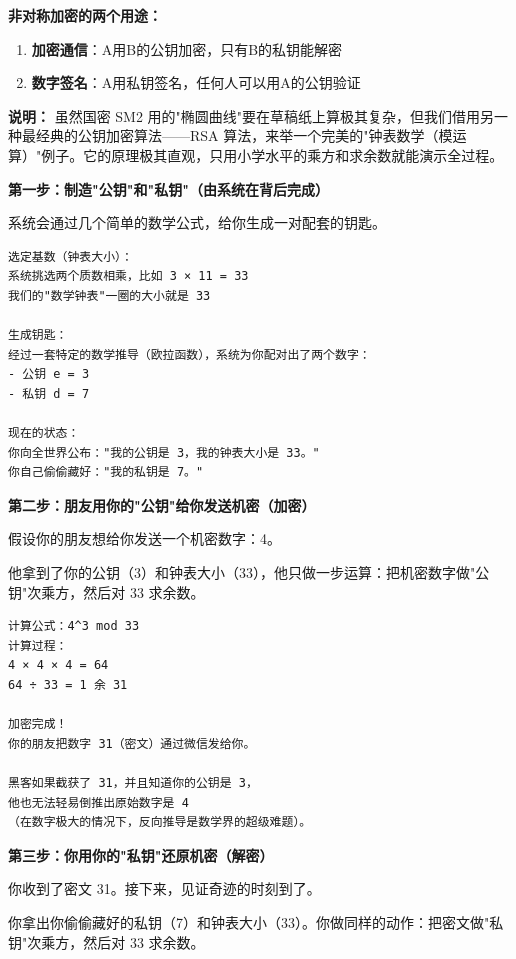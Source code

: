 ﻿\documentclass[12pt,a4paper]{article}
\begin{document}
\begin{theorybox}
\textbf{非对称加密的两个用途：}
\begin{enumerate}
\item \textbf{加密通信}：A用B的公钥加密，只有B的私钥能解密
\item \textbf{数字签名}：A用私钥签名，任何人可以用A的公钥验证
\end{enumerate}
\end{theorybox}

\begin{examplebox}
\textbf{说明：} 虽然国密 SM2 用的"椭圆曲线"要在草稿纸上算极其复杂，但我们借用另一种最经典的公钥加密算法——RSA 算法，来举一个完美的"钟表数学（模运算）"例子。它的原理极其直观，只用小学水平的乘方和求余数就能演示全过程。

\textbf{第一步：制造"公钥"和"私钥"（由系统在背后完成）}

系统会通过几个简单的数学公式，给你生成一对配套的钥匙。

\begin{lstlisting}
选定基数（钟表大小）：
系统挑选两个质数相乘，比如 3 × 11 = 33
我们的"数学钟表"一圈的大小就是 33

生成钥匙：
经过一套特定的数学推导（欧拉函数），系统为你配对出了两个数字：
- 公钥 e = 3
- 私钥 d = 7

现在的状态：
你向全世界公布："我的公钥是 3，我的钟表大小是 33。"
你自己偷偷藏好："我的私钥是 7。"
\end{lstlisting}

\textbf{第二步：朋友用你的"公钥"给你发送机密（加密）}

假设你的朋友想给你发送一个机密数字：4。

他拿到了你的公钥（3）和钟表大小（33），他只做一步运算：把机密数字做"公钥"次乘方，然后对 33 求余数。

\begin{lstlisting}
计算公式：4^3 mod 33
计算过程：
4 × 4 × 4 = 64
64 ÷ 33 = 1 余 31

加密完成！
你的朋友把数字 31（密文）通过微信发给你。

黑客如果截获了 31，并且知道你的公钥是 3，
他也无法轻易倒推出原始数字是 4
（在数字极大的情况下，反向推导是数学界的超级难题）。
\end{lstlisting}

\textbf{第三步：你用你的"私钥"还原机密（解密）}

你收到了密文 31。接下来，见证奇迹的时刻到了。

你拿出你偷偷藏好的私钥（7）和钟表大小（33）。你做同样的动作：把密文做"私钥"次乘方，然后对 33 求余数。


\end{examplebox}
\end{document}
